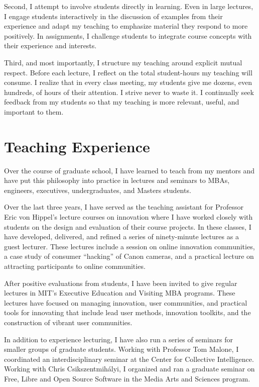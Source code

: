 \documentclass[10pt]{memoir}
\begin{document}
Second, I attempt to involve students directly in learning. Even in
large lectures, I engage students interactively in the discussion of
examples from their experience and adapt my teaching to emphasize
material they respond to more positively. In assignments, I challenge
students to integrate course concepts with their experience and
interests.

Third, and most importantly, I structure my teaching around
explicit mutual respect. Before each lecture, I reflect on the total
student-hours my teaching will consume. I realize that in every class
meeting, my students give me dozens, even hundreds, of hours of their
attention. I strive never to waste it. I continually seek feedback
from my students so that my teaching is more relevant, useful, and
important to them.

\section{Teaching Experience}

Over the course of graduate school, I have learned to teach from my
mentors and have put this philosophy into practice in lectures and
seminars to MBAs, engineers, executives, undergraduates, and Masters
students.

Over the last three years, I have served as the teaching assistant for
Professor Eric von Hippel's lecture courses on innovation where I have
worked closely with students on the design and evaluation of their
course projects. In these classes, I have developed, delivered, and
refined a series of ninety-minute lectures as a guest lecturer. These
lectures include a session on online innovation communities, a case
study of consumer ``hacking'' of Canon cameras, and a practical
lecture on attracting participants to online communities.

After positive evaluations from students, I have been invited to give
regular lectures in MIT's Executive Education and Visiting MBA
programs. These lectures have focused on managing innovation, user
communities, and practical tools for innovating that include lead user
methods, innovation toolkits, and the construction of vibrant user
communities.

In addition to experience lecturing, I have also run a series of
seminars for smaller groups of graduate students. Working with
Professor Tom Malone, I coordinated an interdisciplinary seminar at
the Center for Collective Intelligence. Working with Chris
Csikszentmihályi, I organized and ran a graduate seminar on Free,
Libre and Open Source Software in the Media Arts and Sciences program.
\end{document}
